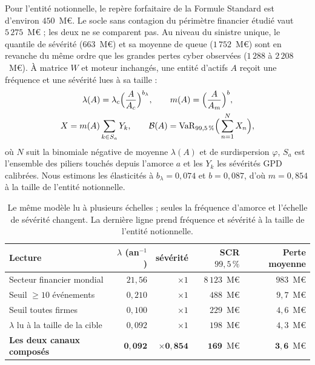 Pour l'entité notionnelle, le repère forfaitaire de la Formule Standard est d'environ
$450$~M\euro. Le socle sans contagion du périmètre financier étudié vaut $5\,275$~M\euro{} ;
les deux ne se comparent pas. Au niveau du
sinistre unique, le quantile de sévérité ($663$~M\euro) et sa moyenne de queue ($1\,752$~M\euro)
sont en revanche du même ordre que les grandes pertes cyber observées ($1\,288$ à $2\,208$~M\euro). À matrice $W$ et moteur inchangés, une entité d'actifs $A$ reçoit une fréquence et une
sévérité lues à sa taille :
\begin{equation}\label{eq:descente}
\begin{gathered}
\lambda(A)=\lambda_c\Big(\frac{A}{A_c}\Big)^{b_\lambda},\qquad
m(A)=\Big(\frac{A}{A_m}\Big)^{b},\\
X=m(A)\sum_{k\in S_a}Y_k,\qquad
\mathcal{B}(A)=\mathrm{VaR}_{99{,}5\,\%}\Big(\sum_{n=1}^{N}X_n\Big),
\end{gathered}
\end{equation}
où $N$ suit la binomiale négative de moyenne $\lambda(A)$ et de surdispersion $\varphi$, $S_a$ est
l'ensemble des piliers touchés depuis l'amorce $a$ et les $Y_k$ les sévérités GPD calibrées. Nous
estimons les élasticités à $b_\lambda = 0{,}074$ et $b = 0{,}087$, d'où $m = 0{,}854$ à la taille
de l'entité notionnelle.

\begin{table}[htbp]\centering
\small
\begin{tabular}{lrrrr}
\toprule
Lecture & $\lambda$ (an$^{-1}$) & sévérité & SCR $99{,}5\,\%$ & Perte moyenne \\
\midrule
Secteur financier mondial & $21{,}56$ & $\times 1$ & $8\,123$~M\euro & $983$~M\euro \\
Seuil \og{}$\geq 10$ événements\fg{} & $0{,}210$ & $\times 1$ & $488$~M\euro & $9{,}7$~M\euro \\
Seuil \og{}toutes firmes\fg{} & $0{,}100$ & $\times 1$ & $229$~M\euro & $4{,}6$~M\euro \\
$\lambda$ lu à la taille de la cible & $0{,}092$ & $\times 1$ & $198$~M\euro & $4{,}3$~M\euro \\
\textbf{Les deux canaux composés} & $\mathbf{0{,}092}$ & $\mathbf{\times 0{,}854}$ &
$\mathbf{169}$~M\euro & $\mathbf{3{,}6}$~M\euro \\
\bottomrule
\end{tabular}
\caption{Le même modèle lu à plusieurs échelles ; seules la fréquence d'amorce et l'échelle de
sévérité changent. La dernière ligne prend fréquence et sévérité à la taille de l'entité notionnelle.}
\label{tab:echelle}
\end{table}

